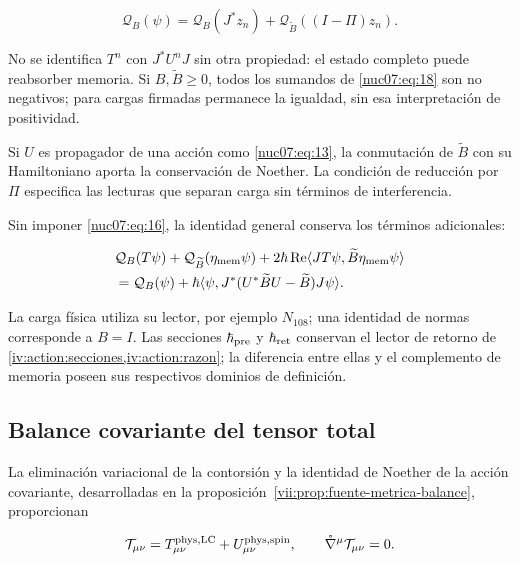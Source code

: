 \begin{equation}
\mathcal Q_B(\psi)=
\mathcal Q_B(J^*z_n)+
\mathcal Q_{\widetilde B}((I-\Pi)z_n).
\label{nuc07:eq:19}
\end{equation}

No se identifica \(T^n\) con \(J^*U^nJ\) sin otra propiedad: el estado completo puede reabsorber memoria. Si \(B,\widetilde B\ge0\), todos los sumandos de \eqref{nuc07:eq:18} son no negativos; para cargas firmadas permanece la igualdad, sin esa interpretación de positividad.

Si \(U\) es propagador de una acción como \eqref{nuc07:eq:13}, la conmutación de \(\widetilde B\) con su Hamiltoniano aporta la conservación de Noether. La condición de reducción por \(\Pi\) especifica las lecturas que separan carga sin términos de interferencia.

Sin imponer \eqref{nuc07:eq:16}, la identidad general conserva los términos adicionales:

\begin{equation}
\begin{aligned}
&\mathcal Q_B(T\psi)+\mathcal Q_{\widetilde B}(\eta_{\rm mem}\psi)
+2\hbar\operatorname{Re}
\langle JT\psi,\widetilde B\eta_{\rm mem}\psi\rangle\\
&=\mathcal Q_B(\psi)+
\hbar\langle\psi,J^*(U^*\widetilde BU-\widetilde B)J\psi\rangle.
\end{aligned}
\label{nuc07:eq:20}
\end{equation}

La carga física utiliza su lector, por ejemplo \(N_{108}\); una identidad de normas corresponde a \(B=I\). Las secciones \(\hbar_{\rm pre}\) y \(\hbar_{\rm ret}\) conservan el lector de retorno de \cref{iv:action:secciones,iv:action:razon}; la diferencia entre ellas y el complemento de memoria poseen sus respectivos dominios de definición.

\subsection{Balance covariante del tensor total}

La eliminación variacional de la contorsión y la identidad de Noether de la acción covariante, desarrolladas en la proposición~\ref{vii:prop:fuente-metrica-balance}, proporcionan

\begin{equation}
\mathcal T_{\mu\nu}
=T^{\rm phys,LC}_{\mu\nu}+U^{\rm phys,spin}_{\mu\nu},
\qquad
\mathring\nabla^\mu\mathcal T_{\mu\nu}=0.
\label{nuc07:eq:21}
\end{equation}

